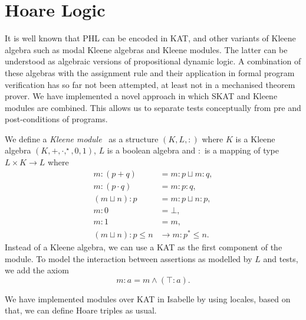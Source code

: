 \documentclass{llncs}
\begin{document}
\section{Hoare Logic}
\label{sec:hoare}

It is well known that PHL can be encoded in KAT, and other variants of
Kleene algebra such as modal Kleene algebras and Kleene modules. The
latter can be understood as algebraic versions of propositional
dynamic logic. A combination of these algebras with the assignment
rule and their application in formal program verification has so far
not been attempted, at least not in a mechanised theorem prover. We
have implemented a novel approach in which SKAT and Kleene modules are
combined. This allows us to separate tests conceptually from pre and
post-conditions of programs.

We define a \emph{Kleene module}~\cite{KM} as a structure
$(K,L,:)$ where $K$ is a Kleene algebra
$(K,+,\cdot,^\star,0,1)$, $L$ is a boolean algebra and $:$
is a mapping of type $L \times K \to L$ where
\begin{align*}
  m : (p + q) &= m : p \sqcup m : q,\\
  m : (p \cdot q) &= m : p : q,\\
  (m \sqcup n) : p &= m : p \sqcup n : p,\\
  m : 0 &= \bot,\\
  m : 1 &= m,\\
  (m \sqcup n) : p \le n &\longrightarrow m : p^\ast \le n.
\end{align*}
Instead of a Kleene algebra, we can use a KAT as the first component
of the module. To model the interaction between assertions as modelled
by $L$ and tests, we add the axiom
\begin{equation*}
  m : a = m \wedge (\top : a).
\end{equation*}

We have implemented modules over KAT in Isabelle by using locales,
based on that, we can define Hoare triples as usual.
\end{document}
